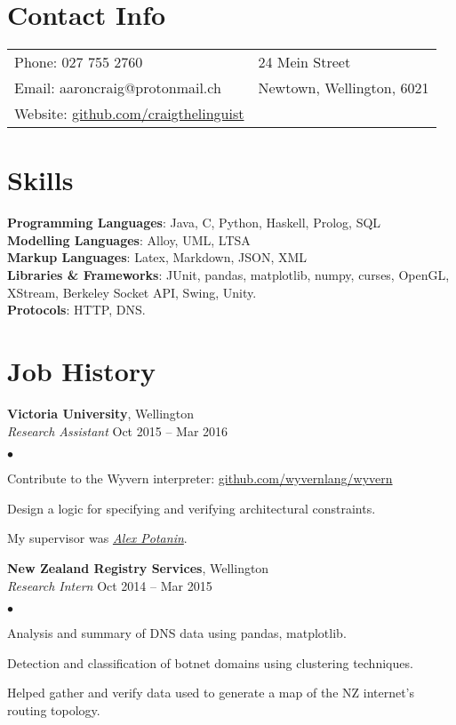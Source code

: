 \documentclass[margin,line]{res}
\newenvironment{list2}{
  \begin{list}{$\bullet$}{%
      \setlength{\itemsep}{0in}
      \setlength{\parsep}{0in} \setlength{\parskip}{0in}
      \setlength{\topsep}{0in} \setlength{\partopsep}{0in}
      \setlength{\leftmargin}{0.2in}}}
  {\end{list}}
\begin{document}
\begin{resume}

  \section{\sc Contact Info}
    \vspace{.05in}
    \begin{tabular}{@{}p{3.5in}p{3in}}
      {Phone}: 027 755 2760 & 24 Mein Street \\
      {Email}: aaroncraig@protonmail.ch & Newtown, Wellington, 6021 \\
      {Website}: \url{github.com/craigthelinguist}
    \end{tabular}

   \section{\sc Skills}
    {\bf Programming Languages}: Java, C, Python, Haskell, Prolog, SQL\\
    {\bf Modelling Languages}: Alloy, UML, LTSA\\
    {\bf Markup Languages}: Latex, Markdown, JSON, XML\\
    {\bf Libraries \& Frameworks}: JUnit, pandas, matplotlib, numpy, curses, OpenGL, XStream, Berkeley Socket API, Swing, Unity.\\
    {\bf Protocols}: HTTP, DNS.

  \section{\sc Job History}
  
  	{\bf Victoria University}, Wellington\\
  	{\em Research Assistant} \hfill {Oct 2015 -- Mar 2016}
  	\begin{list2}
  		\item Contribute to the Wyvern interpreter: \url{github.com/wyvernlang/wyvern}
		\item Design a logic for specifying and verifying architectural constraints.
  		\item My supervisor was \href{http://homepages.mcs.vuw.ac.nz/~alex/}{\textit{Alex Potanin}}.
	\end{list2}
  
    {\bf New Zealand Registry Services}, Wellington\\
    {\em Research Intern} \hfill {Oct 2014 -- Mar 2015}
    \begin{list2}
	\item Analysis and summary of DNS data using pandas, matplotlib.
	\item Detection and classification of botnet domains using clustering techniques.
	\item Helped gather and verify data used to generate a map of the NZ internet's routing topology.
    \end{list2}


\end{resume}
\end{document}

